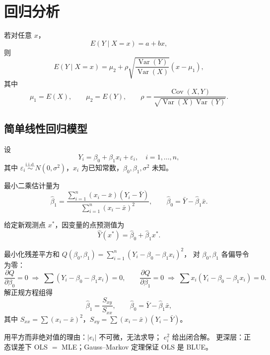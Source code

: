\chapter{回归分析}
\begin{theorem}[5.1.1]
若对任意 $x$，
\[
E(Y \mid X=x)=a+bx,
\tag{5.1.4}
\]
则
\[
E(Y \mid X=x)
=
\mu_2
+
\rho
\sqrt{\frac{\operatorname{Var}(Y)}{\operatorname{Var}(X)}}
(x-\mu_1),
\]
其中
\[
\mu_1=E(X),\qquad
\mu_2=E(Y),\qquad
\rho=
\frac{\operatorname{Cov}(X,Y)}
{\sqrt{\operatorname{Var}(X)\operatorname{Var}(Y)}}.
\]
\end{theorem}

\section{简单线性回归模型}

\begin{definition}[简单线性回归模型]
设
\[
Y_i = \beta_0 + \beta_1 x_i + \varepsilon_i, \quad i=1,\ldots,n,
\]
其中 $\varepsilon_i \overset{\text{i.i.d.}}{\sim} N(0,\sigma^2)$，$x_i$ 为已知常数，$\beta_0,\beta_1,\sigma^2$ 未知。
\end{definition}

\begin{theorem}
最小二乘估计量为
\[
\hat{\beta}_1 = \frac{\sum_{i=1}^n (x_i-\bar{x})(Y_i-\bar{Y})}{\sum_{i=1}^n (x_i-\bar{x})^2}, \qquad
\hat{\beta}_0 = \bar{Y} - \hat{\beta}_1\bar{x}.
\]
\end{theorem}

\begin{theorem}[点预测]
给定新观测点 $x^*$，因变量的点预测值为
\[
\hat{Y}(x^*) = \hat{\beta}_0 + \hat{\beta}_1 x^*.
\]
\end{theorem}
\begin{theorem}
最小化残差平方和 $Q(\beta_0,\beta_1)=\sum_{i=1}^n(Y_i-\beta_0-\beta_1 x_i)^2$，
对 $\beta_0,\beta_1$ 各偏导令为零：
\[
\frac{\partial Q}{\partial\beta_0}=0
\;\Rightarrow\;\sum(Y_i-\beta_0-\beta_1 x_i)=0,\qquad
\frac{\partial Q}{\partial\beta_1}=0
\;\Rightarrow\;\sum x_i(Y_i-\beta_0-\beta_1 x_i)=0.
\]
解正规方程组得
\[
\hat{\beta}_1=\frac{S_{xy}}{S_{xx}},\qquad
\hat{\beta}_0=\bar{Y}-\hat{\beta}_1\bar{x},
\]
其中 $S_{xx}=\sum(x_i-\bar{x})^2$，$S_{xy}=\sum(x_i-\bar{x})(Y_i-\bar{Y})$。
\end{theorem}

\begin{note}
用平方而非绝对值的理由：$|e_i|$ 不可微，无法求导；
$e_i^2$ 给出闭合解。
更深层：正态误差下 OLS $=$ MLE；Gauss--Markov 定理保证 OLS 是 BLUE。
\end{note}

